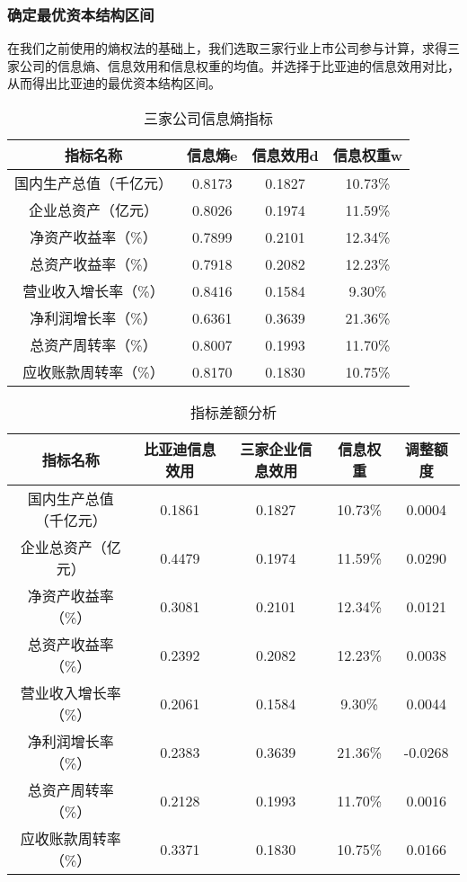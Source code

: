 \subsubsection{确定最优资本结构区间}
在我们之前使用的熵权法的基础上，我们选取三家行业上市公司参与计算，求得三家公司的信息熵、信息效用和信息权重的均值。并选择于比亚迪的信息效用对比，从而得出比亚迪的最优资本结构区间。
\begin{table}
  \centering
  \begin{threeparttable}[c]
    \caption{三家公司信息熵指标}
    \label{tab:indicator-hierarchy-multiple-data}
    \begin{tabular}{cccc}
      \toprule
        指标名称 & 信息熵e & 信息效用d & 信息权重w \\ 
      \midrule
        国内生产总值（千亿元） & 0.8173  & 0.1827  & 10.73\% \\ 
        企业总资产（亿元） & 0.8026  & 0.1974  & 11.59\% \\ 
        净资产收益率（\%） & 0.7899  & 0.2101  & 12.34\% \\ 
        总资产收益率（\%） & 0.7918  & 0.2082  & 12.23\% \\ 
        营业收入增长率（\%） & 0.8416  & 0.1584  & 9.30\% \\ 
        净利润增长率（\%） & 0.6361  & 0.3639  & 21.36\% \\
        总资产周转率（\%） & 0.8007  & 0.1993  & 11.70\% \\ 
        应收账款周转率（\%） & 0.8170  & 0.1830  & 10.75\% \\ 
      \bottomrule
    \end{tabular}
  \end{threeparttable}
\end{table}

\begin{table}
  \centering
  \begin{threeparttable}[c]
    \caption{指标差额分析}
    \label{tab:indicator-hierarchy-different-data}
    \begin{tabular}{ccccc}
      \toprule
        指标名称 & 比亚迪信息效用 & 三家企业信息效用 & 信息权重 & 调整额度 \\ 
      \midrule
        国内生产总值（千亿元） & 0.1861  & 0.1827  & 10.73\% & 0.0004  \\ 
        企业总资产（亿元） & 0.4479  & 0.1974  & 11.59\% & 0.0290  \\ 
        净资产收益率（\%） & 0.3081  & 0.2101  & 12.34\% & 0.0121  \\ 
        总资产收益率（\%） & 0.2392  & 0.2082  & 12.23\% & 0.0038  \\ 
        营业收入增长率（\%） & 0.2061  & 0.1584  & 9.30\% & 0.0044  \\ 
        净利润增长率（\%） & 0.2383  & 0.3639  & 21.36\% & -0.0268  \\ 
        总资产周转率（\%） & 0.2128  & 0.1993  & 11.70\% & 0.0016  \\ 
        应收账款周转率（\%） & 0.3371  & 0.1830  & 10.75\% & 0.0166 \\
      \bottomrule
    \end{tabular}
  \end{threeparttable}
\end{table}

